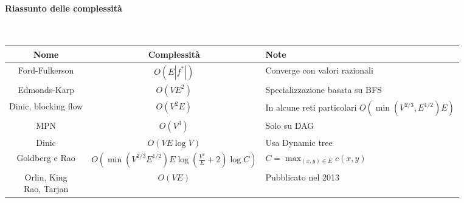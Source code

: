 \paragraph{Riassunto delle complessità}
\mbox{}\\
\begin{table}[h!]
\centering
\renewcommand{\arraystretch}{1.2}
\begin{tabular}{|c|c|p{}|}
    \hline
    \textbf{Nome} & \textbf{Complessità} & \textbf{Note}\\
    \hline
    Ford-Fulkerson & $O(E|f^*|)$ & Converge con valori razionali\\
    \hline
    Edmonds-Karp & $O(VE^2)$ & Specializzazione basata su BFS\\
    \hline
    Dinic, blocking flow & $O(V^2E)$ & In alcune reti particolari
    $O(\min(V^{2/3},E^{1/2})E)$\\
    \hline
    MPN & $O(V^3)$ & Solo su DAG\\
    \hline
    Dinic & $O(VE\log V)$ & Usa Dynamic tree\\
    \hline
    Goldberg e Rao & $O(\min(V^{2/3}E^{1/2})E\log(\frac{V^2}{E}+2)\log C)$ &
    $C=\max_{(x,y)\in E}c(x,y)$\\
    \hline
    \makecell[t]{Orlin, King\\Rao, Tarjan} & $O(VE)$ & Pubblicato nel 2013\\
    \hline
\end{tabular}
\end{table}